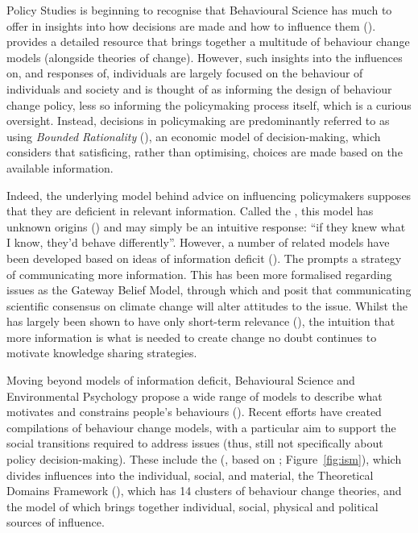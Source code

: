 Policy Studies is beginning to recognise that Behavioural Science has much to offer in insights into how decisions are made and how to influence them (\cite{CairneyW2017}). \textcite{Darnton2008} provides a detailed resource that brings together a multitude of behaviour change models (alongside theories of change). However, such insights into the influences on, and responses of, individuals are largely focused on the behaviour of individuals and society and is thought of as informing the design of behaviour change policy,  less so informing the policymaking process itself, which is a curious oversight. Instead, decisions in policymaking are predominantly referred to as using \emph{Bounded Rationality} (\cite{CairneyO2020,CairneyTS2023}), an economic model of decision-making, which considers that satisficing, rather than optimising, choices are made based on the available information. 

Indeed, the underlying model behind advice on influencing policymakers supposes that they are deficient in relevant information. Called the \IDM{}, this model has unknown origins (\cite{Nerlich2017}) and may simply be an intuitive response: ``if they knew what I know, they'd behave differently''. However, a number of related models have been developed based on ideas of information deficit (\cite{Darnton2008}). The \IDM{} prompts a strategy of communicating more information. This has been more formalised regarding \CAN{} issues as the Gateway Belief Model, through which \textcite{vanderLindenLFM2015} and \textcite{vanderLinden2021} posit that communicating scientific consensus on climate change will alter attitudes to the issue. Whilst the \IDM{} has largely been shown to have only short-term relevance (\cite[p24-5]{BA2024trust}), the intuition that more information is what is needed to create change no doubt continues to motivate knowledge sharing strategies.

Moving beyond models of information deficit, Behavioural Science and Environmental Psychology propose a wide range of models to describe what motivates and constrains people's behaviours (\cite{Darnton2008}). Recent efforts have created compilations of behaviour change models, with a particular aim to support the social transitions required to address \CAN{} issues (thus, still not specifically about policy decision-making). These include the \ISM{} (\cite{DarntonH2013}, based on \cite{SouthertonME2011}; Figure~\ref{fig:ism}), which divides influences into the individual, social, and material, the Theoretical Domains Framework (\cite{AtkinsFIOPIFDCGLM2017}), which has 14 clusters of behaviour change theories, and the model of \textcite{HamptonW2023} which brings together individual, social, physical and political sources of influence.

